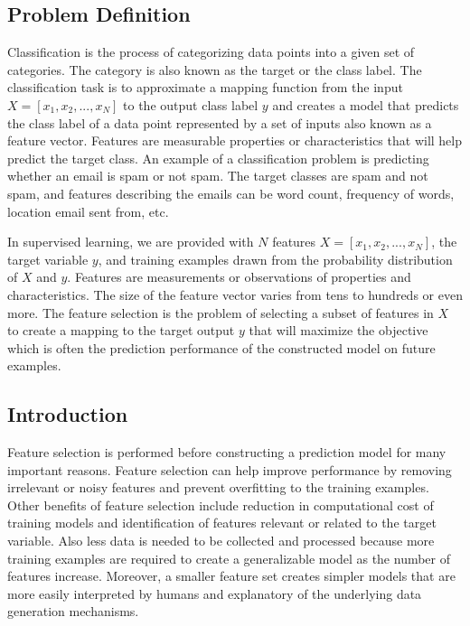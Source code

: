 \subsection{Problem Definition}
\indent Classification is the process of categorizing data points into a given set of categories. The category is also known as the target or the class label. The classification task is to approximate a mapping function from the input \(X=[x_1, x_2, ..., x_N]\) to the output class label \(y\) and creates a model that predicts the class label of a data point represented by a set of inputs also known as a feature vector. Features are measurable properties or characteristics that will help predict the target class. An example of a classification problem is predicting whether an email is spam or not spam. The target classes are spam and not spam, and features describing the emails can be word count, frequency of words, location email sent from, etc. 

\indent In supervised learning, we are provided with \(N\) features \(X=[x_1, x_2, ..., x_N]\), the target variable \(y\), and training examples drawn from the probability distribution of \(X\) and \(y\). Features are measurements or observations of properties and characteristics. The size of the feature vector varies from tens to hundreds or even more. The feature selection is the problem of selecting a subset of features in \(X\) to create a mapping to the target output \(y\) that will maximize the objective which is often the prediction performance of the constructed model on future examples.

\subsection{Introduction}
\indent Feature selection is performed before constructing a prediction model for many important reasons. Feature selection can help improve performance by removing irrelevant or noisy features and prevent overfitting to the training examples. Other benefits of feature selection include reduction in computational cost of training models and identification of features relevant or related to the target variable. Also less data is needed to be collected and processed because more training examples are required to create a generalizable model as the number of features increase. Moreover, a smaller feature set creates simpler models that are more easily interpreted by humans and explanatory of the underlying data generation mechanisms.  


